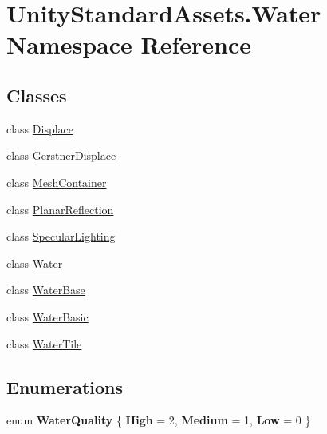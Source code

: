 \hypertarget{namespace_unity_standard_assets_1_1_water}{}\section{Unity\+Standard\+Assets.\+Water Namespace Reference}
\label{namespace_unity_standard_assets_1_1_water}
\subsection*{Classes}
\begin{DoxyCompactItemize}
\item 
class \hyperlink{class_unity_standard_assets_1_1_water_1_1_displace}{Displace}
\item 
class \hyperlink{class_unity_standard_assets_1_1_water_1_1_gerstner_displace}{Gerstner\+Displace}
\item 
class \hyperlink{class_unity_standard_assets_1_1_water_1_1_mesh_container}{Mesh\+Container}
\item 
class \hyperlink{class_unity_standard_assets_1_1_water_1_1_planar_reflection}{Planar\+Reflection}
\item 
class \hyperlink{class_unity_standard_assets_1_1_water_1_1_specular_lighting}{Specular\+Lighting}
\item 
class \hyperlink{class_unity_standard_assets_1_1_water_1_1_water}{Water}
\item 
class \hyperlink{class_unity_standard_assets_1_1_water_1_1_water_base}{Water\+Base}
\item 
class \hyperlink{class_unity_standard_assets_1_1_water_1_1_water_basic}{Water\+Basic}
\item 
class \hyperlink{class_unity_standard_assets_1_1_water_1_1_water_tile}{Water\+Tile}
\end{DoxyCompactItemize}
\subsection*{Enumerations}
\begin{DoxyCompactItemize}
\item 
enum {\bfseries Water\+Quality} \{ {\bfseries High} = 2, 
{\bfseries Medium} = 1, 
{\bfseries Low} = 0
 \}\hypertarget{namespace_unity_standard_assets_1_1_water_ac23a9da55bc8ba734d644ff4cc1f15f5}{}\label{namespace_unity_standard_assets_1_1_water_ac23a9da55bc8ba734d644ff4cc1f15f5}

\end{DoxyCompactItemize}
